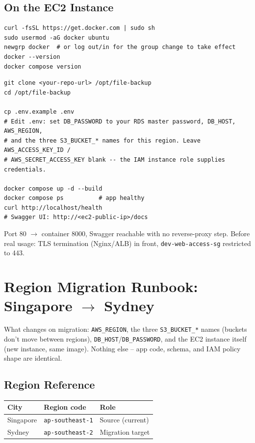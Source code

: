 \documentclass[10pt]{article}
\begin{document}
\subsection{On the EC2 Instance}
\begin{lstlisting}[style=bashStyle, caption={Install Docker on Ubuntu (official convenience script)}]
curl -fsSL https://get.docker.com | sudo sh
sudo usermod -aG docker ubuntu
newgrp docker  # or log out/in for the group change to take effect
docker --version
docker compose version
\end{lstlisting}

\begin{lstlisting}[style=bashStyle, caption={Deploy the app}]
git clone <your-repo-url> /opt/file-backup
cd /opt/file-backup

cp .env.example .env
# Edit .env: set DB_PASSWORD to your RDS master password, DB_HOST, AWS_REGION,
# and the three S3_BUCKET_* names for this region. Leave AWS_ACCESS_KEY_ID /
# AWS_SECRET_ACCESS_KEY blank -- the IAM instance role supplies credentials.

docker compose up -d --build
docker compose ps          # app healthy
curl http://localhost/health
# Swagger UI: http://<ec2-public-ip>/docs
\end{lstlisting}

\begin{tipbox}
Port 80 $\to$ container 8000, Swagger reachable with no reverse-proxy step.
Before real usage: TLS termination (Nginx/ALB) in front, \texttt{dev-web-access-sg}
restricted to 443.
\end{tipbox}

\section[Region Migration Runbook]{\texorpdfstring{Region Migration Runbook: Singapore $\to$ Sydney}{Region Migration Runbook: Singapore to Sydney}}
\label{sec:migration}

What changes on migration: \texttt{AWS\_REGION}, the three
\texttt{S3\_BUCKET\_*} names (buckets don't move between regions),
\texttt{DB\_HOST}/\texttt{DB\_PASSWORD}, and the EC2 instance itself (new instance, same
image). Nothing else -- app code, schema, and IAM policy shape are identical.

\subsection{Region Reference}
\noindent \begin{tabularx}{\textwidth}{@{}l l X@{}}
\toprule
\rowcolor{tableHead} \textbf{City} & \textbf{Region code} & \textbf{Role} \\
\midrule
Singapore & \texttt{ap-southeast-1} & Source (current) \\
\rowcolor{tableAlt} Sydney & \texttt{ap-southeast-2} & Migration target \\
\bottomrule
\end{tabularx}
\end{document}
